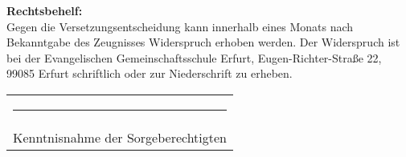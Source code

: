 {\begin{minipage}[t][.99\textheight][t]{.97\textwidth}
		\vfill
		
		{\footnotesize
			\textbf{Rechtsbehelf:}\\
			Gegen die Versetzungsentscheidung kann innerhalb eines Monats nach
			Bekanntgabe des Zeugnisses Widerspruch erhoben werden. Der Widerspruch
			ist bei der Evangelischen Gemeinschaftsschule Erfurt,
			Eugen-Richter-Straße 22, 99085 Erfurt schriftlich oder zur Niederschrift
			zu erheben.\\[3em]
			\begin{tabularx}{\linewidth}{C{.6\linewidth}}
				\rule{\linewidth}{1pt} \\[-.3ex]
				{\centering Kenntnisnahme der Sorgeberechtigten}\\%
			\end{tabularx}
		}
	\end{minipage}%
}%

